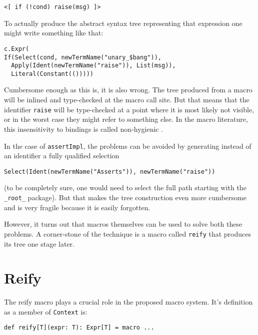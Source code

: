 \documentclass{llncs}
\begin{document}
\begin{lstlisting}
<[ if (!cond) raise(msg) ]>
\end{lstlisting}

To actually produce the abstract syntax tree representing that expression one might write something like that:

\begin{lstlisting}
c.Expr(
If(Select(cond, newTermName("unary_$bang")),
  Apply(Ident(newTermName("raise")), List(msg)),
  Literal(Constant(()))))
\end{lstlisting}

Cumbersome enough as this is, it is also wrong. The tree produced from a macro will be inlined and type-checked at the macro call site. But that means that the identifier \lstinline$raise$ will be type-checked at a point where it is most likely not visible, or in the worst case they might refer to something else. In the macro literature, this insensitivity to bindings is called non-hygienic \cite{kohlbecker86,skalski05}.

In the case of \lstinline$assertImpl$, the problems can be avoided by generating instead of an identifier a fully qualified selection

\begin{lstlisting}
Select(Ident(newTermName("Asserts")), newTermName("raise"))
\end{lstlisting}

(to be completely sure, one would need to select the full path starting with the \lstinline$_root_$ package). But that makes the tree construction even more cumbersome and is very fragile because it is easily forgotten.

However, it turns out that macros themselves can be used to solve both these problems. A corner-stone of the technique is a macro called \lstinline$reify$ that produces its tree one stage later.

\section{Reify}

The reify macro plays a crucial role in the proposed macro system. It’s definition as a member of \lstinline$Context$ is:

\begin{lstlisting}
def reify[T](expr: T): Expr[T] = macro ...
\end{lstlisting}
\end{document}

